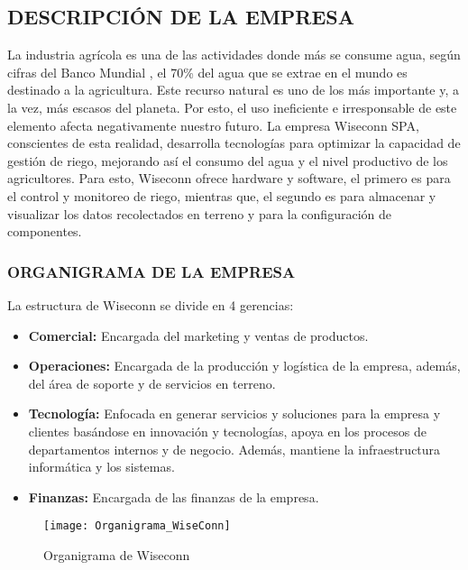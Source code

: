 
\subsection{DESCRIPCIÓN DE LA EMPRESA}

La industria agrícola es una de las actividades donde más se consume agua, según cifras del Banco Mundial \cite{bancomundialagua}, el 70\% del agua que se extrae en el mundo es destinado a la agricultura. Este recurso natural es uno de los más importante y, a la vez, más escasos del planeta. Por esto, el uso ineficiente e irresponsable de este elemento afecta negativamente nuestro futuro.
La empresa Wiseconn SPA, conscientes de esta realidad, desarrolla tecnologías para optimizar la capacidad de gestión de riego, mejorando así el consumo del agua y el nivel productivo de los agricultores. Para esto, Wiseconn ofrece hardware y software, el primero es para el control y monitoreo de riego, mientras que, el segundo es para almacenar y visualizar los datos recolectados en terreno y para la configuración de componentes.

\subsubsection{ORGANIGRAMA DE LA EMPRESA}

La estructura de Wiseconn se divide en 4 gerencias:
\begin{itemize}
	\item \textbf{Comercial:} Encargada del marketing y ventas de productos.
	\item \textbf{Operaciones:} Encargada de la producción y logística de la empresa, además, del área de soporte y de servicios en terreno.
	\item \textbf{Tecnología:} Enfocada en generar servicios y soluciones para la empresa y clientes basándose en innovación y tecnologías, apoya en los procesos de departamentos internos y de negocio. Además, mantiene la infraestructura informática y los sistemas.
	\item \textbf{Finanzas:} Encargada de las finanzas de la empresa.
\end{itemize}

\begin{figure}[h]
	\centering
	\texttt{[image: Organigrama\_WiseConn]}
	\caption{\label{fig:orgwis} Organigrama de Wiseconn}
\end{figure}

